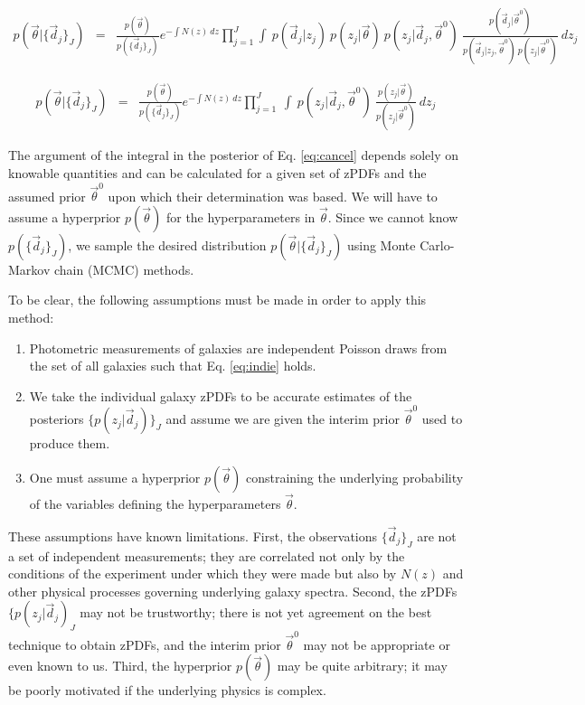 \documentclass[preprint]{aastex}
\begin{document}
\begin{eqnarray}
\label{eq:expand}
p(\vec{\theta}|\{\vec{d}_{j}\}_{J}) &=& \frac{p(\vec{\theta})}{p(\{\vec{d}_{j}\}_{J})}e^{-\int N(z)\ dz}\prod_{j=1}^{J}\int\ p(\vec{d}_{j}|z_{j})\ p(z_{j}|\vec{\theta})\ p(z_{j}|\vec{d}_{j},\vec{\theta}^{0})\ \frac{p(\vec{d}_{j}|\vec{\theta}^{0})}{p(\vec{d}_{j}|z_{j},\vec{\theta}^{0})\ p(z_{j}|\vec{\theta}^{0})}\ dz_{j}
\end{eqnarray}

\begin{eqnarray}
\label{eq:cancel}
p(\vec{\theta}|\{\vec{d}_{j}\}_{J}) &=& \frac{p(\vec{\theta})}{p(\{\vec{d}_{j}\}_{J})}e^{-\int N(z)\ dz}\prod_{j=1}^{J}\ \int\ p(z_{j}|\vec{d}_{j},\vec{\theta}^{0})\ \frac{p(z_{j}|\vec{\theta})}{p(z_{j}|\vec{\theta}^{0})}\ dz_{j}
\end{eqnarray}

The argument of the integral in the posterior of Eq. \ref{eq:cancel} depends solely on knowable quantities and can be calculated for a given set of zPDFs and the assumed prior $\vec{\theta}^{0}$ upon which their determination was based.  We will have to assume a hyperprior $p(\vec{\theta})$ for the hyperparameters in $\vec{\theta}$.  Since we cannot know $p(\{\vec{d}_{j}\}_{J})$, we sample the desired distribution $p(\vec{\theta}|\{\vec{d}_{j}\}_{J})$ using Monte Carlo-Markov chain (MCMC) methods.  

To be clear, the following assumptions must be made in order to apply this method:

\begin{enumerate}
\item Photometric measurements of galaxies are independent Poisson draws from the set of all galaxies such that Eq. \ref{eq:indie} holds.
\item We take the individual galaxy zPDFs to be accurate estimates of the posteriors $\{p(z_{j}|\vec{d}_{j})\}_{J}$ and assume we are given the interim prior $\vec{\theta}^{0}$ used to produce them.
\item One must assume a hyperprior $p(\vec{\theta})$ constraining the underlying probability of the variables defining the hyperparameters $\vec{\theta}$.
\end{enumerate}

These assumptions have known limitations.  First, the observations $\{\vec{d}_{j}\}_{J}$ are not a set of independent measurements; they are correlated not only by the conditions of the experiment under which they were made but also by $N(z)$ and other physical processes governing underlying galaxy spectra.  Second, the zPDFs $\{p(z_{j}|\vec{d}_{j})_{J}$ may not be trustworthy; there is not yet agreement on the best technique to obtain zPDFs, and the interim prior $\vec{\theta}^{0}$ may not be appropriate or even known to us.  Third, the hyperprior $p(\vec{\theta})$ may be quite arbitrary; it may be poorly motivated if the underlying physics is complex.
\end{document}
